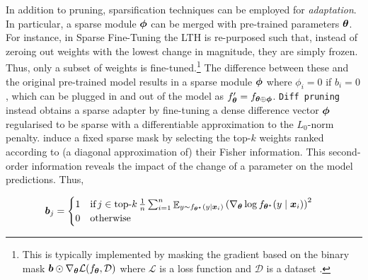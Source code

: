 \documentclass[10pt]{article} %
\begin{document}
In addition to pruning, sparsification techniques can be employed for \textit{adaptation}. In particular, a sparse module ${\bm{\phi}}$ can be merged with pre-trained parameters ${\bm{\theta}}$. For instance, in Sparse Fine-Tuning \citep[SFT;][]{ansell2021composable} the LTH is re-purposed such that, instead of zeroing out weights with the lowest change in magnitude, they are simply frozen. Thus, only a subset of weights is fine-tuned.\footnote{This is typically implemented by masking the gradient based on the binary mask ${\bm{b}} \odot \nabla_{\bm{\theta}} \mathcal{L}(f_{\bm{\theta}}, \mathcal{D})$ where $\mathcal{L}$ is a loss function and $\mathcal{D}$ is a dataset \citep{ansell2021composable}.} The difference between these and the original pre-trained model results in a sparse module ${\bm{\phi}}$ where $\phi_i = 0$ if $b_i = 0$, which can be plugged in and out of the model as $f^\prime_{{\bm{\theta}}} = f_{{\bm{\theta}} \oplus {\bm{\phi}}}$. \texttt{Diff pruning}~\citep{guo-etal-2021-parameter} instead obtains a sparse adapter by fine-tuning a dense difference vector ${\bm{\phi}}$ regularised to be sparse with a differentiable approximation to the
$L_0$-norm penalty. \citet{sung2021training} induce a fixed sparse mask by selecting the top-$k$ weights ranked according to (a diagonal approximation of) their Fisher information. This second-order information reveals the impact of the change of a parameter on the model predictions. Thus,

\begin{equation}
    {\bm{b}}_j = \begin{cases}
        1 \quad \text{if} \, j \in \text{top-}k \, \frac{1}{n} \sum_{i=1}^n \mathop{\mathbb{E}}_{y \sim f_{{\bm{\theta}}^\star}(y \mid {\bm{x}}_i)} \left(\nabla_{\bm{\theta}} \log f_{{\bm{\theta}}^\star}(y \mid {\bm{x}}_i)\right)^2\\
        0 \quad \text{otherwise}
    \end{cases}
\end{equation}
\end{document}
